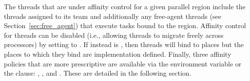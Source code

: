 The threads that are under affinity control for a given parallel region include
the threads assigned to its team and additionally any free-agent threads (see
Section~\ref{sec:free_agent}) that execute tasks bound to the region. Affinity
control for threads can be disabled (i.e., allowing threads to migrate freely
across processors) by setting  to . If instead
 is , then threads will bind to places but the
places to which they bind are implementation defined. Finally, three affinity
policies that are more prescriptive are available via the environment variable
or the  clause: , , and
. These are detailed in the following section. 



%   
%     

%   
%    
%     

%   
%     
%     








